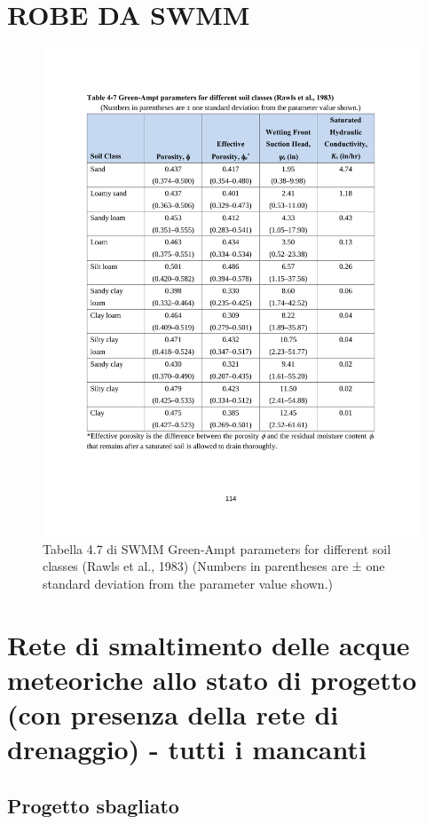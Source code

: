 \chapter{ROBE DA SWMM}
\label{appendix:SWMM}
%
\begin{figure}[htbp]
    \centering
    \includegraphics[trim=2.5cm 4.5cm 2.5cm 3.6cm,clip,width=\textwidth]{IMG/table4-7_Ks.pdf} 
    \caption[Tabella 4.7 di SWMM]{Tabella 4.7 di SWMM Green-Ampt parameters for different soil classes (Rawls et al., 1983) (Numbers in parentheses are ± one standard deviation from the parameter value shown.)}
    \label{SWMM:tabella4-7}
\end{figure}

\chapter{Rete di smaltimento delle acque meteoriche allo stato di progetto (con presenza
della rete di drenaggio) - tutti i mancanti}
\label{appendix:FasiIntermedie}
\section{Progetto sbagliato}
